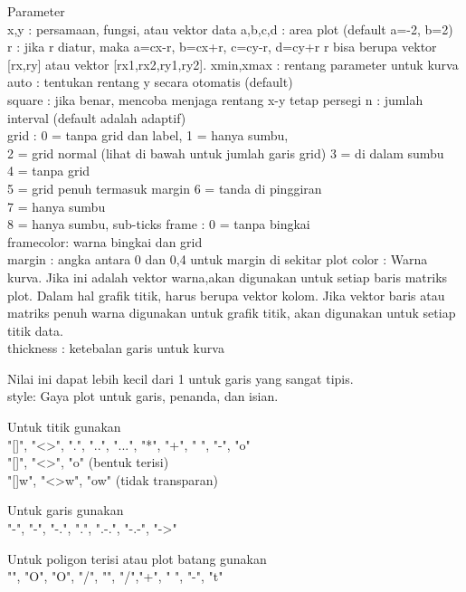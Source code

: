 \documentclass{article}
\begin{document}
\begin{eulernotebook}
\begin{eulercomment}
\begin{eulercomment}
\begin{eulercomment}
\begin{eulercomment}
\begin{eulercomment}
Parameter\\
x,y : persamaan, fungsi, atau vektor data a,b,c,d : area plot (default
a=-2, b=2)\\
r  :  jika  r  diatur,  maka  a=cx-r,  b=cx+r,  c=cy-r,  d=cy+r r bisa
berupa vektor [rx,ry] atau vektor [rx1,rx2,ry1,ry2]. xmin,xmax :
rentang parameter untuk kurva\\
auto : tentukan rentang y secara otomatis (default)\\
square : jika benar, mencoba menjaga rentang x-y tetap persegi n :
jumlah interval (default adalah adaptif)\\
grid : 0 = tanpa grid dan label, 1 = hanya sumbu,\\
2 = grid normal (lihat di bawah untuk jumlah garis grid) 3 = di dalam
sumbu\\
4 = tanpa grid\\
5 = grid penuh termasuk margin 6 = tanda di pinggiran\\
7 = hanya sumbu\\
8 = hanya sumbu, sub-ticks frame : 0 = tanpa bingkai\\
framecolor: warna bingkai dan grid\\
margin : angka antara 0 dan 0,4 untuk margin di sekitar plot color :
Warna kurva. Jika ini adalah vektor warna,akan digunakan untuk setiap
baris matriks plot. Dalam  hal grafik titik, harus berupa vektor
kolom. Jika vektor baris atau matriks penuh warna digunakan untuk
grafik titik, akan digunakan untuk setiap titik data.\\
thickness : ketebalan garis untuk kurva

Nilai ini dapat lebih kecil dari 1 untuk garis yang sangat tipis. \\
style: Gaya plot untuk garis, penanda, dan isian.

Untuk titik gunakan\\
"[]", "\textless{}\textgreater{}", ".", "..", "...", "*", "+", " ", "-", "o"\\
"[]", "\textless{}\textgreater{}", "o" (bentuk terisi)\\
"[]w", "\textless{}\textgreater{}w", "ow" (tidak transparan)

Untuk garis gunakan\\
"-", "-", "-.", ".", ".-.", "-.-", "-\textgreater{}"

Untuk poligon terisi atau plot batang gunakan\\
"", "O", "O", "/", "", "/","+", " ", "-", "t"


\end{eulercomment}
\end{eulercomment}
\end{eulercomment}
\end{eulercomment}
\end{eulercomment}
\end{eulernotebook}
\end{document}
